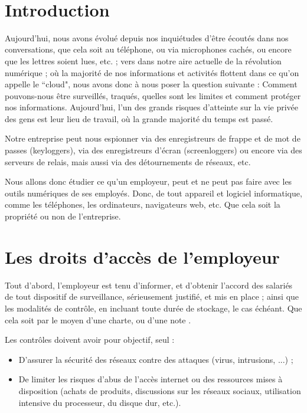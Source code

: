 \documentclass[final, a4paper, 13pt]{article}
\begin{document}
~\\[-10pt]

\begin{multicols}{2}

\vspace*{\fill}

\section*{Introduction}
Aujourd'hui, nous avons évolué depuis nos inquiétudes d'être écoutés dans nos conversations,
que cela soit au téléphone, ou via microphones cachés, ou encore que les lettres soient lues, etc. ; vers
dans notre aire actuelle de la révolution numérique ; où la majorité de nos informations
et activités flottent dans ce qu'on appelle le ``cloud", nous avons donc
à nous poser la question suivante :
Comment pouvons-nous être surveillés, traqués, quelles sont les limites et comment protéger nos
informations. Aujourd'hui, l'un des grands risques d'atteinte sur la vie privée des gens est leur lieu de travail, où la grande majorité du temps est passé.

Notre entreprise peut nous espionner via des enregistreurs de frappe et de mot de passes (keyloggers),
via des enregistreurs d'écran (screenloggers) ou encore via des serveurs de relais, 
mais aussi via des détournements de réseaux,
etc. \cite{spywares}

Nous allons donc étudier ce qu'un employeur, 
peut et ne peut pas faire avec les outils numériques de ses employés.
Donc, de tout appareil et logiciel informatique,
comme les téléphones, les ordinateurs, navigateurs web, etc. 
Que cela soit la propriété ou non de l'entreprise.

\vspace*{\fill}

\columnbreak

\section{Les droits d'accès de l’employeur}
Tout d'abord, l'employeur est tenu d'informer, et d'obtenir l'accord des salariés 
de tout dispositif de surveillance, sérieusement justifié, et mis en place ;
ainsi que les modalités de contrôle, en incluant toute durée de stockage,
le cas échéant. Que cela soit par le moyen d’une charte, ou d’une note \cite{orange}.

Les contrôles doivent avoir pour objectif, seul :

\begin{itemize}
    \item D’assurer la sécurité des réseaux contre des attaques (virus, intrusions, ...) ;
    \item De limiter les risques d’abus de l'accès internet ou des ressources mises à disposition 
    (achats de produits, discussions sur les réseaux sociaux, utilisation intensive du processeur, 
    du disque dur, etc.).
\end{itemize}


\end{multicols}
\end{document}
